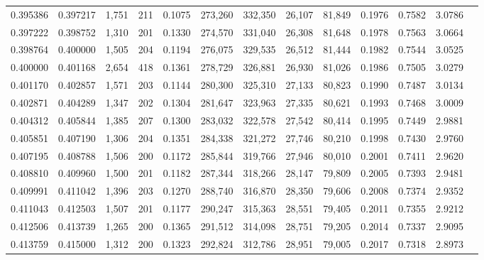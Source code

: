 \begin{tabular}{rrrrrrrrrrrrr}
0.395386 & 0.397217 &  1,751 &   211 &                                     0.1075 & 273,260 & 332,350 &  26,107 &  81,849 & 0.1976 & 0.7582 & 3.0786 \\
0.397222 & 0.398752 &  1,310 &   201 &                                     0.1330 & 274,570 & 331,040 &  26,308 &  81,648 & 0.1978 & 0.7563 & 3.0664 \\
0.398764 & 0.400000 &  1,505 &   204 &                                     0.1194 & 276,075 & 329,535 &  26,512 &  81,444 & 0.1982 & 0.7544 & 3.0525 \\
0.400000 & 0.401168 &  2,654 &   418 &                                     0.1361 & 278,729 & 326,881 &  26,930 &  81,026 & 0.1986 & 0.7505 & 3.0279 \\
0.401170 & 0.402857 &  1,571 &   203 &                                     0.1144 & 280,300 & 325,310 &  27,133 &  80,823 & 0.1990 & 0.7487 & 3.0134 \\
0.402871 & 0.404289 &  1,347 &   202 &                                     0.1304 & 281,647 & 323,963 &  27,335 &  80,621 & 0.1993 & 0.7468 & 3.0009 \\
0.404312 & 0.405844 &  1,385 &   207 &                                     0.1300 & 283,032 & 322,578 &  27,542 &  80,414 & 0.1995 & 0.7449 & 2.9881 \\
0.405851 & 0.407190 &  1,306 &   204 &                                     0.1351 & 284,338 & 321,272 &  27,746 &  80,210 & 0.1998 & 0.7430 & 2.9760 \\
0.407195 & 0.408788 &  1,506 &   200 &                                     0.1172 & 285,844 & 319,766 &  27,946 &  80,010 & 0.2001 & 0.7411 & 2.9620 \\
0.408810 & 0.409960 &  1,500 &   201 &                                     0.1182 & 287,344 & 318,266 &  28,147 &  79,809 & 0.2005 & 0.7393 & 2.9481 \\
0.409991 & 0.411042 &  1,396 &   203 &                                     0.1270 & 288,740 & 316,870 &  28,350 &  79,606 & 0.2008 & 0.7374 & 2.9352 \\
0.411043 & 0.412503 &  1,507 &   201 &                                     0.1177 & 290,247 & 315,363 &  28,551 &  79,405 & 0.2011 & 0.7355 & 2.9212 \\
0.412506 & 0.413739 &  1,265 &   200 &                                     0.1365 & 291,512 & 314,098 &  28,751 &  79,205 & 0.2014 & 0.7337 & 2.9095 \\
0.413759 & 0.415000 &  1,312 &   200 &                                     0.1323 & 292,824 & 312,786 &  28,951 &  79,005 & 0.2017 & 0.7318 & 2.8973 \\

\end{tabular}
